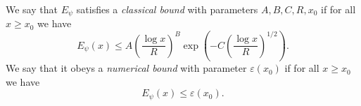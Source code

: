 \begin{definition}
\label{classical-bound-psi}
\leanok
We say that $E_\psi$ satisfies a \emph{classical bound}
  with parameters $A, B, C, R, x_0$ if for all
  $x \geq x_0$ we have
  \[ E_\psi(x) \leq A \left(\frac{\log x}{R}\right)^B
     \exp\left(-C \left(\frac{\log x}{R}\right)^{1/2}
     \right). \]
  We say that it obeys a \emph{numerical bound} with
  parameter $\varepsilon(x_0)$ if for all $x \geq x_0$
  we have
  \[ E_\psi(x) \leq \varepsilon(x_0). \]
\end{definition}
